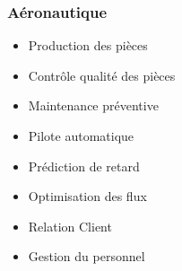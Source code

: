 \begin{frame}
  \frametitle{Aéronautique}
  \begin{minipage}[c]{0.49\linewidth}
    \begin{itemize}
    \item Production des pièces
    \item Contrôle qualité des pièces
    \item Maintenance préventive
    \item Pilote automatique
    \item Prédiction de retard
    \item Optimisation des flux
    \item Relation Client
    \item Gestion du personnel
    \end{itemize}
  \end{minipage}\hfill
  \begin{minipage}[c]{0.49\linewidth}
  \end{minipage}\hfill
\end{frame}

